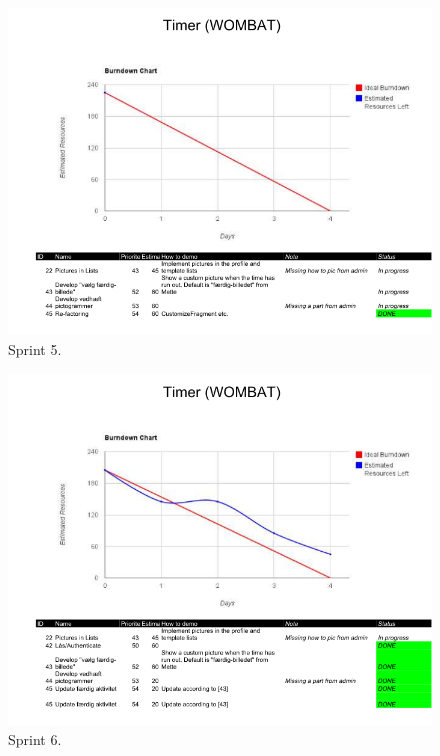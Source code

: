 	\begin{figure}[H]
		\centering
			\includegraphics[width=\textwidth]{Development/burndown_charts/Sprint_5.png}
				\caption{Sprint 5.}
		\label{fig:sprint5}
	\end{figure}
	
	\begin{figure}[H]
		\centering
			\includegraphics[width=\textwidth]{Development/burndown_charts/Sprint_6.png}
				\caption{Sprint 6.}
		\label{fig:sprint6}
	\end{figure}
	
